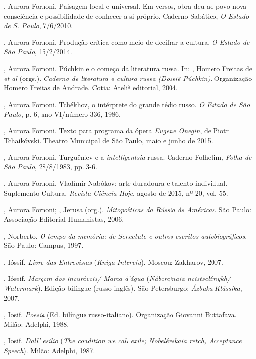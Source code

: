 \begin{Parskip}
{, Aurora Fornoni. Paisagem local e universal. Em versos,
obra deu ao povo nova consciência e possibilidade de conhecer a si
próprio. Caderno Sabático, \emph{O Estado de S. Paulo}, 7/6/2010. 

, Aurora Fornoni. Produção crítica como meio de decifrar a cultura. \emph{O Estado de São Paulo}, 15/2/2014.

, Aurora Fornoni. Púchkin e o começo da literatura russa. In: , Homero Freitas de \emph{et al} (orgs.). \emph{Caderno de literatura e cultura russa (Dossiê Púchkin)}. Organização Homero Freitas de Andrade. Cotia: Ateliê editorial, 2004.

, Aurora Fornoni. Tchékhov, o intérprete do grande tédio
russo. \emph{O Estado de São Paulo}, p. 6, ano VI/número 336, 1986.

, Aurora Fornoni. Texto para programa da ópera \emph{Eugene Onegin}, de Piotr Tchaikóvski. Theatro Municipal de São Paulo, maio e junho de 2015.

, Aurora Fornoni. Turguêniev e a \emph{intelligentsia} russa. Caderno Folhetim, \emph{Folha de São Paulo}, 28/8/1983, pp. 3-6.

, Aurora Fornoni. Vladímir Nabókov: arte duradoura e talento individual. Suplemento Cultura, \emph{Revista Ciência Hoje}, agosto de 2015, nº 20, vol. 55.

, Aurora Fornoni; , Jerusa (org.). \emph{Mitopoéticas da Rússia às
Américas}. São Paulo: Associação Editorial Humanistas, 2006.

, Norberto. \emph{O tempo da memória: de Senectute e outros escritos
autobiográficos}. São Paulo: Campus, 1997.

, Ióssif. \emph{Livro das Entrevistas} (\emph{Kniga Interviu}).
Moscou: Zakharov, 2007.

, Ióssif. \emph{Margem dos incuráveis/ Marca d'água} (\emph{Náberejnaia neistselímykh/ Watermark}). Edição bilíngue (russo-inglês). São Petersburgo: \emph{Ázbuka-Klássika}, 2007. 

, Iosif. \emph{Poesia} (Ed. bilíngue russo-italiano). Organização
Giovanni Buttafava. Milão: Adelphi, 1988.

, Iosif. \emph{Dall' esilio} (\emph{The condition we call exile; Nobelévskaia retch, Acceptance Speech}). Milão: Adelphi, 1987.

}
\end{Parskip}

